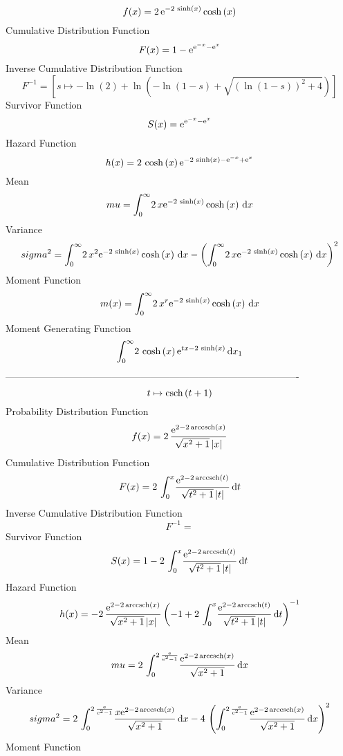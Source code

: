 \documentclass[12pt]{article}
\begin{document}
$$  f(x)=2\,{{\rm e}^{-2\,\sinh \left( x \right) }}\cosh \left( x \right) 
$$Cumulative Distribution Function  
 $$F(x)=1-{{\rm e}^{{{\rm e}^{-x}}-{{\rm e}^{x}}}}
$$ Inverse Cumulative Distribution Function 
  $$F^{-1} = [s\mapsto -\ln  \left( 2 \right) +\ln  \left( -\ln  \left( 1-s
 \right) +\sqrt { \left( \ln  \left( 1-s \right)  \right) ^{2}+4}
 \right) ]
$$Survivor Function 
 $$ S(x)={{\rm e}^{{{\rm e}^{-x}}-{{\rm e}^{x}}}}
$$ Hazard Function 
 $$ h(x)=2\,\cosh \left( x \right) {{\rm e}^{-2\,\sinh \left( x \right) -{
{\rm e}^{-x}}+{{\rm e}^{x}}}}
$$Mean 
 $$ mu=\int_{0}^{\infty }\!2\,x{{\rm e}^{-2\,\sinh \left( x \right) }}\cosh
 \left( x \right) \,{\rm d}x
$$ Variance 
 $$ sigma^2 = \int_{0}^{\infty }\!2\,{x}^{2}{{\rm e}^{-2\,\sinh \left( x \right) }}
\cosh \left( x \right) \,{\rm d}x- \left( \int_{0}^{\infty }\!2\,x{
{\rm e}^{-2\,\sinh \left( x \right) }}\cosh \left( x \right) \,{\rm d}
x \right) ^{2}
$$Moment Function 
 $$ m(x) = \int_{0}^{\infty }\!2\,{x}^{r}{{\rm e}^{-2\,\sinh \left( x \right) }}
\cosh \left( x \right) \,{\rm d}x
$$ Moment Generating Function 
 $$\int_{0}^{\infty }\!2\,\cosh \left( x \right) {{\rm e}^{tx-2\,\sinh
 \left( x \right) }}\,{\rm d}x_{{1}}
$$-------------------------------------------------------------------------------------------  \\$$t\mapsto {\rm csch} \left(t+1\right)
$$Probability Distribution Function 
$$  f(x)=2\,{\frac {{{\rm e}^{2-2\,{\rm arccsch} \left(x\right)}}}{\sqrt {{x}^{
2}+1} \left| x \right| }}
$$Cumulative Distribution Function  
 $$F(x)=2\,\int_{0}^{x}\!{\frac {{{\rm e}^{2-2\,{\rm arccsch} \left(t\right)}}
}{\sqrt {{t}^{2}+1} \left| t \right| }}\,{\rm d}t
$$ Inverse Cumulative Distribution Function 
  $$F^{-1} = $$Survivor Function 
 $$ S(x)=1-2\,\int_{0}^{x}\!{\frac {{{\rm e}^{2-2\,{\rm arccsch} \left(t\right)
}}}{\sqrt {{t}^{2}+1} \left| t \right| }}\,{\rm d}t
$$ Hazard Function 
 $$ h(x)=-2\,{\frac {{{\rm e}^{2-2\,{\rm arccsch} \left(x\right)}}}{\sqrt {{x}^
{2}+1} \left| x \right| } \left( -1+2\,\int_{0}^{x}\!{\frac {{{\rm e}^
{2-2\,{\rm arccsch} \left(t\right)}}}{\sqrt {{t}^{2}+1} \left| t
 \right| }}\,{\rm d}t \right) ^{-1}}
$$Mean 
 $$ mu=2\,\int_{0}^{2\,{\frac {{\rm e}}{{{\rm e}^{2}}-1}}}\!{\frac {{{\rm e}^
{2-2\,{\rm arccsch} \left(x\right)}}}{\sqrt {{x}^{2}+1}}}\,{\rm d}x
$$ Variance 
 $$ sigma^2 = 2\,\int_{0}^{2\,{\frac {{\rm e}}{{{\rm e}^{2}}-1}}}\!{\frac {x{{\rm e}
^{2-2\,{\rm arccsch} \left(x\right)}}}{\sqrt {{x}^{2}+1}}}\,{\rm d}x-4
\, \left( \int_{0}^{2\,{\frac {{\rm e}}{{{\rm e}^{2}}-1}}}\!{\frac {{
{\rm e}^{2-2\,{\rm arccsch} \left(x\right)}}}{\sqrt {{x}^{2}+1}}}
\,{\rm d}x \right) ^{2}
$$Moment Function 
\end{document}
